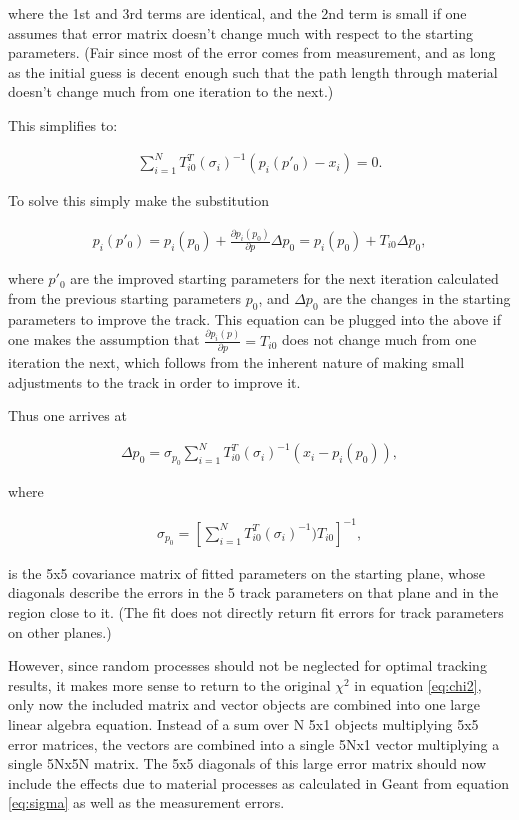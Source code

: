     where the 1st and 3rd terms are identical, and the 2nd term is small if one assumes that error matrix doesn't change much with respect to the starting parameters. (Fair since most of the error comes from measurement, and as long as the initial guess is decent enough such that the path length through material doesn't change much from one iteration to the next.)

    This simplifies to: 

\begin{align} \label{eq:solve}
\sum_{i=1}^{N} T^{T}_{i0}(\sigma_{i})^{-1}(p_{i}(p'_{0})-x_{i}) = 0.
\end{align}

    To solve this simply make the substitution 

\begin{align} \label{eq:psub}
p_{i}(p'_{0}) = p_{i}(p_{0}) + \frac{\partial p_{i}(p_{0})}{\partial p} \Delta p_{0} = p_{i}(p_{0}) + T_{i0} \Delta p_{0},
\end{align}

    where $p'_{0}$ are the improved starting parameters for the next iteration calculated from the previous starting parameters $p_{0}$, and $\Delta p_{0}$ are the changes in the starting parameters to improve the track. This equation can be plugged into the above if one makes the assumption that $\frac{\partial p_{i}(p)}{\partial p} = T_{i0}$ does not change much from one iteration the next, which follows from the inherent nature of making small adjustments to the track in order to improve it.

    Thus one arrives at 

\begin{align} \label{eq:deltap}
\Delta p_{0} = \sigma_{p_{0}} \sum_{i=1}^{N} T^{T}_{i0}(\sigma_{i})^{-1}(x_{i} - p_{i}(p_{0})),
\end{align}

    where

\begin{align} \label{eq:cov}
\sigma_{p_{0}} = [\sum_{i=1}^{N} T^{T}_{i0} (\sigma_{i})^{-1}) T_{i0} ]^{-1},
\end{align}

    is the 5x5 covariance matrix of fitted parameters on the starting plane, whose diagonals describe the errors in the 5 track parameters on that plane and in the region close to it. (The fit does not directly return fit errors for track parameters on other planes.) 

    However, since random processes should not be neglected for optimal tracking results, it makes more sense to return to the original $\chi^2$ in equation \ref{eq:chi2}, only now the included matrix and vector objects are combined into one large linear algebra equation. Instead of a sum over N 5x1 objects multiplying 5x5 error matrices, the vectors are combined into a single 5Nx1 vector multiplying a single 5Nx5N matrix. The 5x5 diagonals of this large error matrix should now include the effects due to material processes as calculated in Geant from equation \ref{eq:sigma} as well as the measurement errors. 

